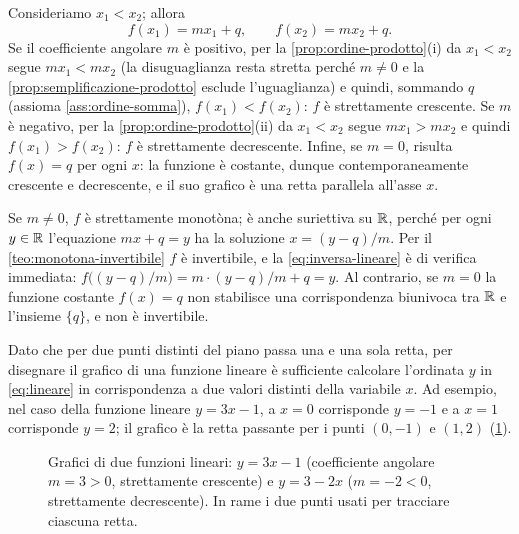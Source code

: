 \begin{dimostrazione}
Consideriamo $x_{1}<x_{2}$; allora
\[
  f(x_{1})=mx_{1}+q, \qquad f(x_{2})=mx_{2}+q .
\]
Se il coefficiente angolare $m$ è positivo, per la \cref{prop:ordine-prodotto}(i) da
$x_{1}<x_{2}$ segue $mx_{1}<mx_{2}$ (la disuguaglianza resta stretta perché $m\neq0$ e
la \cref{prop:semplificazione-prodotto} esclude l'uguaglianza) e quindi, sommando $q$
(assioma \ref{ass:ordine-somma}), $f(x_{1})<f(x_{2})$: $f$ è strettamente crescente. Se
$m$ è negativo, per la \cref{prop:ordine-prodotto}(ii) da $x_{1}<x_{2}$ segue
$mx_{1}>mx_{2}$ e quindi $f(x_{1})>f(x_{2})$: $f$ è strettamente decrescente. Infine, se
$m=0$, risulta $f(x)=q$ per ogni $x$: la funzione è costante, dunque
contemporaneamente crescente e decrescente, e il suo grafico è una retta parallela
all'asse $x$.

Se $m\neq0$, $f$ è strettamente monotòna; è anche suriettiva su $\mathbb{R}$, perché per ogni
$y\in\mathbb{R}$ l'equazione $mx+q=y$ ha la soluzione $x=(y-q)/m$. Per il
\cref{teo:monotona-invertibile} $f$ è invertibile, e la \eqref{eq:inversa-lineare} è
di verifica immediata: $f\bigl((y-q)/m\bigr)=m\cdot(y-q)/m+q=y$. Al contrario, se $m=0$
la funzione costante $f(x)=q$ non stabilisce una corrispondenza biunivoca tra $\mathbb{R}$ e
l'insieme $\{q\}$, e non è invertibile.
\end{dimostrazione}

Dato che per due punti distinti del piano passa una e una sola retta, per disegnare il
grafico di una funzione lineare è sufficiente calcolare l'ordinata $y$ in
\eqref{eq:lineare} in corrispondenza a due valori distinti della variabile $x$. Ad
esempio, nel caso della funzione lineare $y=3x-1$, a $x=0$ corrisponde $y=-1$ e a $x=1$
corrisponde $y=2$; il grafico è la retta passante per i punti $(0,-1)$ e $(1,2)$
(\cref{fig:rette}).

\begin{figure}[htb]
\centering
{}\hfill
{}
\caption{Grafici di due funzioni lineari: $y=3x-1$ (coefficiente angolare $m=3>0$,
strettamente crescente) e $y=3-2x$ ($m=-2<0$, strettamente decrescente). In rame i
due punti usati per tracciare ciascuna retta.}
\label{fig:rette}
\end{figure}

